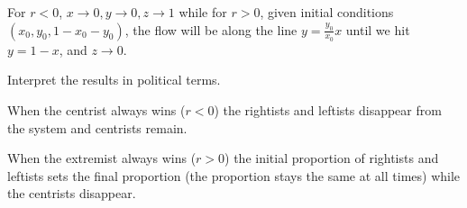 \documentclass[12pt,letterpaper,answers]{exam}
\begin{document}
\begin{questions}
\begin{parts}
\begin{solution}
\begin{itemize}
For $r<0$, $x\rightarrow 0, y\rightarrow 0, z\rightarrow 1$ while for $r> 0$, given initial conditions $(x_0, y_0, 1-x_0-y_0)$, the flow will be along the line $y = \frac{y_0}{x_0} x$ until we hit $y = 1- x$, and $z \rightarrow 0$.

\end{itemize}

\end{solution}
\item Interpret the results in political terms.
\begin{solution}
When the centrist always wins ($r < 0 $) the rightists and leftists disappear from the system and centrists remain.

When the extremist always wins ($r>0$) the initial proportion of rightists and leftists sets the final proportion (the proportion stays the same at all times) while the centrists disappear.
\end{solution}

\end{parts}


 \end{questions}
\end{document}
